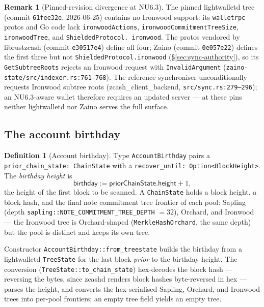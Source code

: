 \documentclass[11pt,a4paper]{article}
\theoremstyle{definition}
\newtheorem{definition}[theorem]{Definition}
\newtheorem{remark}[theorem]{Remark}
\begin{document}
\begin{remark}[Pinned-revision divergence at NU6.3]\label{rem:sync-divergence}
The pinned \textsf{lightwalletd} tree (commit \texttt{61fee32e},
2026-06-25) contains no Ironwood support: its \texttt{walletrpc} protos and
Go code lack \texttt{ironwoodActions}, \texttt{ironwoodCommitmentTreeSize},
\texttt{ironwoodTree}, and \texttt{ShieldedProtocol.\allowbreak
ironwood}. The protos
vendored by \textsf{librustzcash} (commit \texttt{e30517e4}) define all
four; \textsf{Zaino} (commit \texttt{0e057e22}) defines the first three
but not \texttt{ShieldedProtocol.ironwood} (\S\ref{sec:sync-authority}),
so its \texttt{GetSubtreeRoots} rejects an Ironwood request with
\texttt{InvalidArgument}
(\texttt{zaino-state/src/}\allowbreak\texttt{indexer.rs:761--768}).
The reference synchroniser unconditionally requests Ironwood subtree
roots (\textsf{zcash\_client\_backend}, \texttt{src/sync.rs:279--296});
an NU6.3-aware wallet therefore requires an updated server --- at these
pins neither lightwalletd nor Zaino serves the full surface.
\end{remark}

\subsection{The account birthday}\label{sec:sync-birthday}

\begin{definition}[Account birthday]\label{def:sync-birthday}
Type \texttt{AccountBirthday} pairs a \texttt{prior\_chain\_state:
ChainState} with a \texttt{recover\_until: Option<BlockHeight>}. The
\emph{birthday height} is
\[
\mathsf{birthday} := \mathsf{priorChainState.height} + 1,
\]
the height of the first block to be scanned. A
\texttt{ChainState} holds a block height, a block hash, and the final note
commitment tree frontier of each pool: Sapling (depth
\texttt{sapling::\allowbreak NOTE\_COMMITMENT\_\allowbreak TREE\_DEPTH}
$= 32$), Orchard, and
Ironwood --- the Ironwood tree is Orchard-shaped
(\texttt{MerkleHashOrchard}, the same depth) but the pool is distinct and
keeps its own tree.
\end{definition}

Constructor \texttt{AccountBirthday::from\_treestate} builds the birthday
from a lightwalletd \texttt{TreeState} for the last block \emph{prior} to
the birthday height. The conversion
(\texttt{TreeState::}\allowbreak\texttt{to\_chain\_state})
hex-decodes the block hash --- reversing the bytes, since zcashd renders
block hashes byte-reversed in hex --- parses the height, and converts the
hex-serialised Sapling, Orchard, and Ironwood trees into per-pool
frontiers; an empty tree field yields an empty tree.
\end{document}

